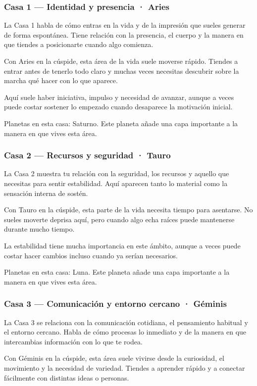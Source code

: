 \documentclass[11pt,a4paper]{article}
\begin{document}
\subsubsection*{Casa 1 — Identidad y presencia · Aries}
La Casa 1 habla de cómo entras en la vida y de la impresión que sueles generar de forma espontánea. Tiene relación con la presencia, el cuerpo y la manera en que tiendes a posicionarte cuando algo comienza.

Con Aries en la cúspide, esta área de la vida suele moverse rápido. Tiendes a entrar antes de tenerlo todo claro y muchas veces necesitas descubrir sobre la marcha qué hacer con lo que aparece.

Aquí suele haber iniciativa, impulso y necesidad de avanzar, aunque a veces puede costar sostener lo empezado cuando desaparece la motivación inicial.

Planetas en esta casa: Saturno. Este planeta añade una capa importante a la manera en que vives esta área.

\subsubsection*{Casa 2 — Recursos y seguridad · Tauro}
La Casa 2 muestra tu relación con la seguridad, los recursos y aquello que necesitas para sentir estabilidad. Aquí aparecen tanto lo material como la sensación interna de sostén.

Con Tauro en la cúspide, esta parte de la vida necesita tiempo para asentarse. No sueles moverte deprisa aquí, pero cuando algo echa raíces puede mantenerse durante mucho tiempo.

La estabilidad tiene mucha importancia en este ámbito, aunque a veces puede costar hacer cambios incluso cuando ya serían necesarios.

Planetas en esta casa: Luna. Este planeta añade una capa importante a la manera en que vives esta área.

\subsubsection*{Casa 3 — Comunicación y entorno cercano · Géminis}
La Casa 3 se relaciona con la comunicación cotidiana, el pensamiento habitual y el entorno cercano. Habla de cómo procesas lo inmediato y de la manera en que intercambias información con lo que te rodea.

Con Géminis en la cúspide, esta área suele vivirse desde la curiosidad, el movimiento y la necesidad de variedad. Tiendes a aprender rápido y a conectar fácilmente con distintas ideas o personas.
\end{document}
